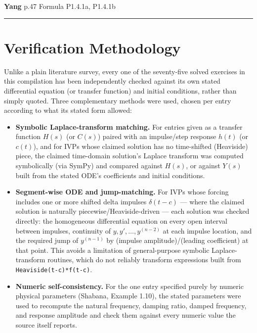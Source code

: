 \documentclass[
  11pt,
]{article}
\providecommand{\tightlist}{%
  \setlength{\itemsep}{0pt}\setlength{\parskip}{0pt}}
\begin{document}
\textbf{Yang} p.47 Formula P1.4.1a, P1.4.1b

\begin{center}\rule{0.5\linewidth}{0.5pt}\end{center}

\hypertarget{verification-methodology}{%
\section{Verification Methodology}\label{verification-methodology}}

Unlike a plain literature survey, every one of the seventy-five solved
exercises in this compilation has been independently checked against its
own stated differential equation (or transfer function) and initial
conditions, rather than simply quoted. Three complementary methods were
used, chosen per entry according to what its stated form allowed:

\begin{itemize}
\tightlist
\item
  \textbf{Symbolic Laplace-transform matching.} For entries given as a
  transfer function \(H(s)\) (or \(C(s)\)) paired with an impulse/step
  response \(h(t)\) (or \(c(t)\)), and for IVPs whose claimed solution
  has no time-shifted (Heaviside) piece, the claimed time-domain
  solution's Laplace transform was computed symbolically (via SymPy) and
  compared against \(H(s)\), or against \(Y(s)\) built from the stated
  ODE's coefficients and initial conditions.
\item
  \textbf{Segment-wise ODE and jump-matching.} For IVPs whose forcing
  includes one or more shifted delta impulses \(\delta(t-c)\) --- where
  the claimed solution is naturally piecewise/Heaviside-driven --- each
  solution was checked directly: the homogeneous differential equation
  on every open interval between impulses, continuity of
  \(y, y', \dots, y^{(n-2)}\) at each impulse location, and the required
  jump of \(y^{(n-1)}\) by (impulse amplitude)/(leading coefficient) at
  that point. This avoids a limitation of general-purpose symbolic
  Laplace-transform routines, which do not reliably transform
  expressions built from \texttt{Heaviside(t-c)*f(t-c)}.
\item
  \textbf{Numeric self-consistency.} For the one entry specified purely
  by numeric physical parameters (Shabana, Example 1.10), the stated
  parameters were used to recompute the natural frequency, damping
  ratio, damped frequency, and response amplitude and check them against
  every numeric value the source itself reports.
\end{itemize}
\end{document}
